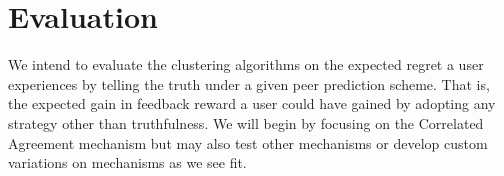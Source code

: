 \documentclass[a4paper, 11pt]{article}
\begin{document}



\section{Evaluation}
We intend to evaluate the clustering algorithms on the expected regret a user experiences by telling the truth under a given peer prediction scheme. That is, the expected gain in feedback reward a user could have gained by adopting any strategy other than truthfulness. We will begin by focusing on the Correlated Agreement mechanism \citep{shnayder2016informed} but may also test other mechanisms or develop custom variations on mechanisms as we see fit.




\end{document}
